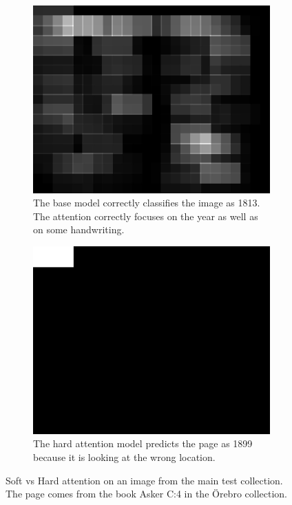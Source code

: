\begin{figure}
    \begin{subfigure}[t]{0.45\textwidth}
        \centering
        \includegraphics[scale=1.0]{resources/SWE_attention/SoftAtt/att_S3HT-64P3-T61.jpg}
        \caption{The base model correctly classifies the image as 1813. The attention correctly focuses on the year as well as on some handwriting.}
    \end{subfigure} \quad %
    \begin{subfigure}[t]{0.45\textwidth}
        \centering    \includegraphics[scale=1.0]{resources/SWE_attention/HardAtt/att_S3HT-64P3-T61.jpg}
        \caption{The hard attention model predicts the page as 1899 because it is looking at the wrong location.}
    \end{subfigure}

    \caption{Soft vs Hard attention on an image from the main test collection. The page comes from the book Asker C:4 in the Örebro collection.}
    \label{fig:attention_dep_T61}
\end{figure}
